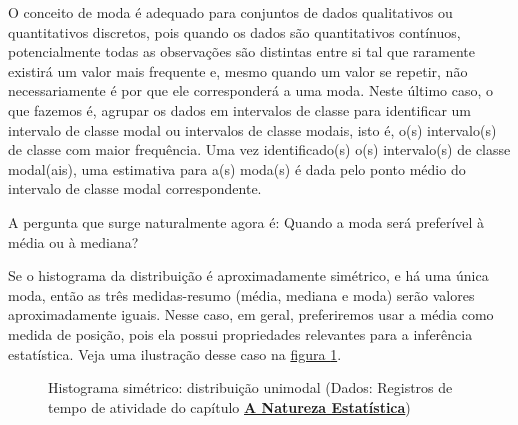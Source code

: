 O conceito de moda é adequado para conjuntos de dados qualitativos ou quantitativos discretos, pois quando os dados são quantitativos contínuos, potencialmente todas as observações são distintas entre si tal que raramente existirá um valor mais frequente e, mesmo quando um valor se repetir, não necessariamente é por que ele corresponderá a uma moda. Neste último caso, o que fazemos é, agrupar os dados em intervalos de classe para identificar um intervalo de classe modal ou intervalos de classe modais, isto é, o(s) intervalo(s) de classe com maior frequência. Uma vez identificado(s) o(s) intervalo(s) de classe modal(ais), uma estimativa para a(s) moda(s) é dada pelo ponto médio do intervalo de classe modal correspondente.

A pergunta que surge naturalmente agora é: Quando a moda será preferível à média ou à mediana?

Se o histograma da distribuição é aproximadamente simétrico, e há uma única moda, então as três medidas-resumo (média, mediana e moda) serão valores aproximadamente iguais. Nesse caso, em geral, preferiremos usar a média como medida de posição, pois ela possui propriedades relevantes para a inferência estatística. Veja uma ilustração desse caso na \hyperref[\detokenize{PE104-1:id18}]{figura \ref{\detokenize{PE104-1:id18}}}.


\begin{figure}[H]
\centering
\capstart

\caption{Histograma simétrico: distribuição unimodal (Dados: Registros de tempo de atividade do capítulo \textbf{\hyperref[est1-chap]{A Natureza Estatística}})}\label{\detokenize{PE104-1:id4}}\label{\detokenize{PE104-1:id18}}\end{figure}

